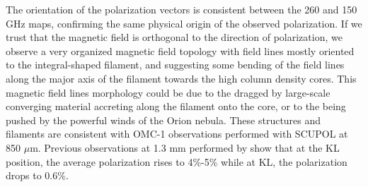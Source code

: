 \documentclass[twocolumn, traditabstract]{aa}
\begin{document}
The orientation of the polarization vectors is consistent between the 260 and 150 GHz maps, confirming the same physical origin of the observed
polarization. 
If we trust that the magnetic field is orthogonal to the direction of polarization, we observe a very organized magnetic field topology with field lines mostly oriented to the integral-shaped filament, and suggesting some bending of the field lines along the major axis of the filament towards the high column density cores. 
This magnetic field lines morphology could be due to the  dragged by large-scale converging material accreting along the filament onto the core, or to 
the  being pushed by the powerful winds of the Orion nebula.
These structures and filaments are consistent with OMC-1
observations performed with SCUPOL \citep{scubapol} at 850 $\mu$m.  
Previous observations at 1.3 mm performed by \cite{leach1991} show that at the KL
position, the average polarization rises to 4\%-5\% while at KL, the
polarization drops to 0.6\%. 
\end{document}
